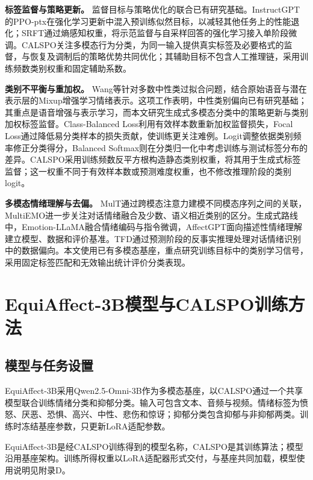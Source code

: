 \documentclass[UTF8,a4paper,11pt,fontset=windows]{ctexart}
\begin{document}
\textbf{标签监督与策略更新。} 监督目标与策略优化的联合已有研究基础。InstructGPT的PPO-ptx在强化学习更新中混入预训练似然目标，以减轻其他任务上的性能退化\cite{ref13}；SRFT通过熵感知权重，将示范监督与自采样回答的强化学习接入单阶段微调\cite{ref14}。CALSPO关注多模态行为分类，为同一输入提供真实标签及必要格式的监督，与恢复及调制后的策略优势共同优化；其辅助目标不包含人工推理链，采用训练频数类别权重和固定辅助系数。

\textbf{类别不平衡与重加权。} Wang等针对多数中性类过拟合问题，结合原始语音与潜在表示层的Mixup增强学习情绪表示\cite{ref25}。这项工作表明，中性类别偏向已有研究基础；其重点是语音增强与表示学习，而本文研究生成式多模态分类中的策略更新与类别加权标签监督。Class-Balanced Loss利用有效样本数重新加权监督损失\cite{ref5}，Focal Loss通过降低易分类样本的损失贡献，使训练更关注难例\cite{ref15}。Logit调整依据类别频率修正分类得分\cite{ref16}，Balanced Softmax则在分类归一化中考虑训练与测试标签分布的差异\cite{ref17}。CALSPO采用训练频数反平方根构造静态类别权重，将其用于生成式标签监督；这一权重不同于有效样本数或预测难度权重，也不修改推理阶段的类别logit。

\textbf{多模态情绪理解与去偏。} MulT通过跨模态注意力建模不同模态序列之间的关联\cite{ref18}，MultiEMO进一步关注对话情绪融合及少数、语义相近类别的区分\cite{ref1}。生成式路线中，Emotion-LLaMA融合情绪编码与指令微调\cite{ref2}，AffectGPT面向描述性情绪理解建立模型、数据和评价基准\cite{ref4}。TFD通过预测阶段的反事实推理处理对话情绪识别中的数据偏向\cite{ref6}。本文使用已有多模态基座，重点研究训练目标中的类别学习信号，采用固定标签匹配和无效输出统计评价分类表现。

\section{EquiAffect-3B模型与CALSPO训练方法}

\subsection{模型与任务设置}

EquiAffect-3B采用Qwen2.5-Omni-3B\cite{ref19}作为多模态基座，以CALSPO通过一个共享模型联合训练情绪分类和抑郁分类。输入可包含文本、音频与视频。情绪标签为愤怒、厌恶、恐惧、高兴、中性、悲伤和惊讶；抑郁分类包含抑郁与非抑郁两类。训练时冻结基座参数，只更新LoRA适配参数\cite{ref20}。

EquiAffect-3B是经CALSPO训练得到的模型名称，CALSPO是其训练算法；模型沿用基座架构。训练所得权重以LoRA适配器形式交付，与基座共同加载，模型使用说明见附录D。
\end{document}
